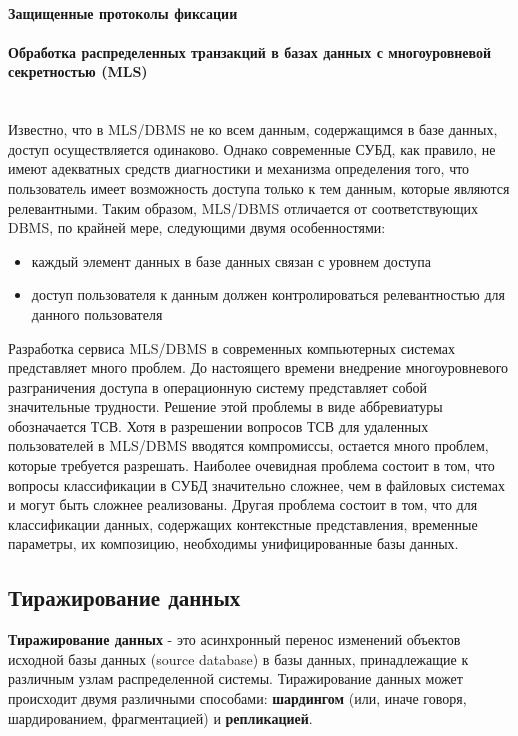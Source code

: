 \paragraph{Защищенные протоколы фиксации}
\paragraph{Обработка распределенных транзакций в базах данных с многоуровневой секретностью (MLS)}~\\
Известно, что в MLS/DBMS не ко всем данным, содержащимся в  базе
данных, доступ осуществляется одинаково. Однако современные СУБД, как
правило,  не имеют адекватных средств диагностики и механизма определения
того, что пользователь имеет возможность доступа только  к  тем
данным,  которые являются релевантными. Таким образом, MLS/DBMS отличается
от соответствующих DBMS,  по крайней  мере,  следующими  двумя
особенностями:
\begin{itemize}
    \item каждый элемент данных в базе данных связан с уровнем доступа
    \item доступ пользователя к данным должен контролироваться релевантностью для данного пользователя
\end{itemize}
Разработка сервиса MLS/DBMS в современных компьютерных  системах
представляет  много  проблем. До настоящего времени внедрение многоуровневого
разграничения доступа в операционную  систему  представляет
собой  значительные трудности. Решение этой проблемы в виде аббревиатуры
обозначается ТСВ. Хотя в разрешении вопросов ТСВ  для  удаленных
пользователей  в  MLS/DBMS вводятся компромиссы, остается много проблем,
которые требуется разрешать. Наиболее очевидная проблема состоит
в том, что вопросы классификации в СУБД значительно  сложнее,  чем  в
файловых  системах  и могут быть сложнее реализованы. Другая проблема
состоит в том, что для классификации данных,  содержащих  контекстные
представления,  временные параметры, их композицию, необходимы унифицированные базы данных.

\subsection{Тиражирование данных}
\textbf{Тиражирование данных} - это асинхронный перенос изменений объектов исходной базы данных (source database)
в базы данных, принадлежащие к различным узлам распределенной системы. Тиражирование данных может происходит
двумя различными способами: \textbf{шардингом} (или, иначе говоря, шардированием, фрагментацией) и \textbf{репликацией}.

